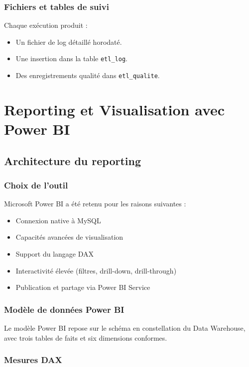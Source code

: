 \documentclass[12pt,a4paper]{report}
\begin{document}
\subsubsection{Fichiers et tables de suivi}

Chaque exécution produit :
\begin{itemize}
    \item Un fichier de log détaillé horodaté.
    \item Une insertion dans la table \texttt{etl\_log}.
    \item Des enregistrements qualité dans \texttt{etl\_qualite}.
\end{itemize}

\section{Reporting et Visualisation avec Power BI}

\subsection{Architecture du reporting}

\subsubsection{Choix de l’outil}

Microsoft Power BI a été retenu pour les raisons suivantes :

\begin{itemize}
    \item Connexion native à MySQL
    \item Capacités avancées de visualisation
    \item Support du langage DAX
    \item Interactivité élevée (filtres, drill-down, drill-through)
    \item Publication et partage via Power BI Service
\end{itemize}

\subsubsection{Modèle de données Power BI}

Le modèle Power BI repose sur le schéma en constellation du Data Warehouse, avec trois tables de faits et six dimensions conformes.

\subsubsection{Mesures DAX}
\end{document}
